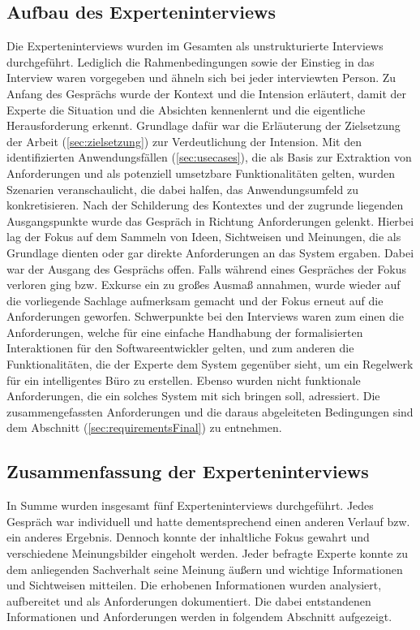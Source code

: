\subsection{Aufbau des Experteninterviews}
    Die Experteninterviews wurden im Gesamten als unstrukturierte Interviews durchgeführt. Lediglich die Rahmenbedingungen sowie 
    der Einstieg in das Interview waren vorgegeben und ähneln sich bei jeder interviewten Person. Zu Anfang des Gesprächs wurde 
    der Kontext und die Intension erläutert, damit der Experte die Situation und die Absichten kennenlernt und die 
    eigentliche Herausforderung 
    erkennt. Grundlage dafür war die Erläuterung der Zielsetzung der Arbeit (\ref{sec:zielsetzung}) zur Verdeutlichung der 
    Intension. Mit den identifizierten Anwendungsfällen (\ref{sec:usecases}), die als Basis 
    zur Extraktion von Anforderungen und als potenziell umsetzbare Funktionalitäten gelten, wurden Szenarien veranschaulicht, 
    die dabei halfen, das Anwendungsumfeld zu konkretisieren.  
    Nach der Schilderung des Kontextes und der zugrunde liegenden Ausgangspunkte wurde das Gespräch in Richtung Anforderungen 
    gelenkt. Hierbei lag der Fokus auf dem Sammeln von Ideen, Sichtweisen und Meinungen, die als Grundlage 
    dienten oder gar direkte Anforderungen an das System ergaben. Dabei war der Ausgang des Gesprächs offen. Falls während 
    eines Gespräches der Fokus verloren ging bzw. Exkurse ein zu großes Ausmaß annahmen, wurde wieder auf die 
    vorliegende Sachlage aufmerksam gemacht und der Fokus erneut auf die Anforderungen geworfen. 
    Schwerpunkte bei den Interviews waren zum einen die Anforderungen, welche für eine einfache Handhabung der 
    formalisierten Interaktionen für den Softwareentwickler gelten, und zum anderen die Funktionalitäten, die der 
    Experte dem System gegenüber sieht, um ein Regelwerk für ein intelligentes Büro zu erstellen. 
    Ebenso wurden nicht funktionale Anforderungen, die ein solches System mit sich bringen soll, adressiert. 
    Die zusammengefassten Anforderungen und die daraus abgeleiteten Bedingungen sind dem Abschnitt (\ref{sec:requirementsFinal}) 
    zu entnehmen.
     
\subsection{Zusammenfassung der Experteninterviews}
    In Summe wurden insgesamt fünf Experteninterviews durchgeführt. Jedes Gespräch war individuell und hatte dementsprechend 
    einen anderen Verlauf bzw. ein anderes Ergebnis. Dennoch konnte der inhaltliche Fokus gewahrt und verschiedene 
    Meinungsbilder eingeholt werden. Jeder befragte Experte konnte zu dem anliegenden Sachverhalt seine Meinung äußern und 
    wichtige Informationen und Sichtweisen mitteilen. Die erhobenen Informationen wurden analysiert, aufbereitet und 
    als Anforderungen dokumentiert. Die dabei entstandenen Informationen und Anforderungen werden in 
    folgendem Abschnitt aufgezeigt. 
    
